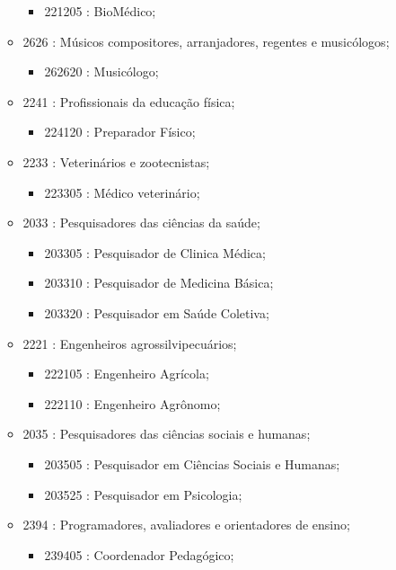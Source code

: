 \begin{itemize}
\begin{itemize}
    \begin{itemize}
      \item 221205 : BioMédico;
    \end{itemize}
    \item 2626 : Músicos compositores, arranjadores, regentes e musicólogos;
    \begin{itemize}
      \item 262620 : Musicólogo;
    \end{itemize}
    \item 2241 : Profissionais da educação física;
    \begin{itemize}
      \item 224120 : Preparador Físico;
    \end{itemize}
    \item 2233 : Veterinários e zootecnistas;
    \begin{itemize}
      \item 223305 : Médico veterinário;
    \end{itemize}
    \item 2033 : Pesquisadores das ciências da saúde;
    \begin{itemize}
      \item 203305 : Pesquisador de Clinica Médica;
      \item 203310 : Pesquisador de Medicina Básica;
      \item 203320 : Pesquisador em Saúde Coletiva;
    \end{itemize}
    \item 2221 : Engenheiros agrossilvipecuários;
    \begin{itemize}
      \item 222105 : Engenheiro Agrícola;
      \item 222110 : Engenheiro Agrônomo;
    \end{itemize}
    \item 2035 : Pesquisadores das ciências sociais e humanas;
    \begin{itemize}
      \item 203505 : Pesquisador em Ciências Sociais e Humanas;
      \item 203525 : Pesquisador em Psicologia;
    \end{itemize}
    \item 2394 : Programadores, avaliadores e orientadores de ensino;
    \begin{itemize}
      \item 239405 : Coordenador Pedagógico;

\end{itemize}
\end{itemize}
\end{itemize}
